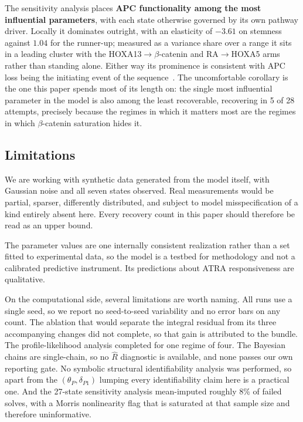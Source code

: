 \documentclass[11pt]{article}
\newcommand{\bcat}{$\beta$-\hspace{0pt}catenin}
\newcommand{\thP}{\theta_P}
\begin{document}
The sensitivity analysis places \textbf{APC functionality among the most
influential parameters}, with each state otherwise governed by its own pathway
driver. Locally it dominates outright, with an elasticity of $-3.61$ on
stemness against $1.04$ for the runner-up; measured as a variance share over a
range it sits in a leading cluster with the HOXA13$\to$\bcat{} and
RA$\to$HOXA5 arms rather than standing alone. Either way its prominence is
consistent with APC loss being the initiating event of the
sequence~\citep{fearon1990genetic,kinzler1996hereditary}.
The uncomfortable corollary is the one this paper spends most of its length on:
the single most influential parameter in the model is also among the least
recoverable, recovering in 5 of 28 attempts, precisely because the regimes in
which it matters most are the regimes in which \bcat{} saturation hides it.

\subsection{Limitations}

We are working with synthetic data generated from the model itself, with
Gaussian noise and all seven states observed. Real measurements would be
partial, sparser, differently distributed, and subject to model misspecification
of a kind entirely absent here. Every recovery count in this paper should
therefore be read as an upper bound.

The parameter values are one internally consistent realization rather than a
set fitted to experimental data, so the model is a testbed for methodology and
not a calibrated predictive instrument. Its predictions about ATRA
responsiveness are qualitative.

On the computational side, several limitations are worth naming. All runs use a
single seed, so we report no seed-to-seed variability and no error bars on any
count. The ablation that would separate the integral residual from its three
accompanying changes did not complete, so that gain is attributed to the bundle.
The profile-likelihood analysis completed for one regime of four. The Bayesian
chains are single-chain, so no $\hat{R}$ diagnostic is available, and none passes
our own reporting gate. No symbolic structural identifiability analysis was
performed, so apart from the $(\thP, \delta_{P1})$ lumping every identifiability
claim here is a practical one. And the 27-state sensitivity analysis
mean-imputed roughly 8\% of failed solves, with a Morris nonlinearity flag that
is saturated at that sample size and therefore uninformative.
\end{document}
